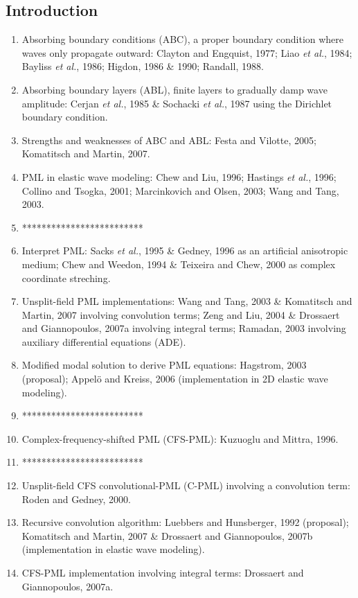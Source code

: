 \documentclass{article}
\newcommand{\sline}{*************************}
\newcommand{\etal}{\textit{et al.}}
\begin{document}
\subsection{Introduction}
\begin{enumerate}[\hspace{10mm}*]
  \item Absorbing boundary conditions (ABC), a proper boundary condition where waves only propagate outward: Clayton and Engquist, 1977; Liao \etal, 1984; Bayliss \etal, 1986; Higdon, 1986 \& 1990; Randall, 1988.
  \item Absorbing boundary layers (ABL), finite layers to gradually damp wave amplitude: Cerjan \etal, 1985 \& Sochacki \etal, 1987 using the Dirichlet boundary condition.
  \item Strengths and weaknesses of ABC and ABL: Festa and Vilotte, 2005; Komatitsch and Martin, 2007.
  \item PML in elastic wave modeling: Chew and Liu, 1996; Hastings \etal, 1996; Collino and Tsogka, 2001; Marcinkovich and Olsen, 2003; Wang and Tang, 2003.
  \item \sline
  \item Interpret PML: Sacks \etal, 1995 \& Gedney, 1996 as an artificial anisotropic medium; Chew and Weedon, 1994 \& Teixeira and Chew, 2000 as complex coordinate streching.
  \item Unsplit-field PML implementations: Wang and Tang, 2003 \& Komatitsch and Martin, 2007 involving convolution terms; Zeng and Liu, 2004 \& Drossaert and Giannopoulos, 2007a involving integral terms; Ramadan, 2003 involving auxiliary differential equations (ADE).
  \item Modified modal solution to derive PML equations: Hagstrom, 2003 (proposal); Appel\"{o} and Kreiss, 2006 (implementation in 2D elastic wave modeling).
  \item \sline
  \item Complex-frequency-shifted PML (CFS-PML): Kuzuoglu and Mittra, 1996.
  \item \sline
  \item Unsplit-field CFS convolutional-PML (C-PML) involving a convolution term: Roden and Gedney, 2000.
  \item Recursive convolution algorithm: Luebbers and Hunsberger, 1992 (proposal); Komatitsch and Martin, 2007 \& Drossaert and Giannopoulos, 2007b (implementation in elastic wave modeling).
  \item CFS-PML implementation involving integral terms: Drossaert and Giannopoulos, 2007a.

\end{enumerate}
\end{document}
